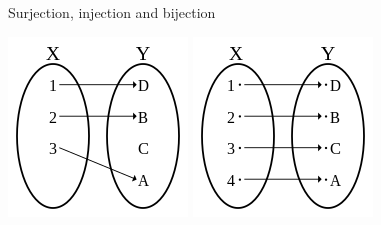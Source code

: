 \documentclass{beamer}
\begin{document}
\begin{frame}{Surjection, injection and bijection}
\begin{center}
\begin{minipage}{0.48\linewidth}
        \end{minipage}
        \hfill
        \begin{minipage}{0.49\linewidth}
            \centering
            \includegraphics[width=0.5\linewidth]{fig/Injection.svg.png}
            \includegraphics[width=0.5\linewidth]{fig/Bijection.svg.png}
        \end{minipage}
    \end{center}
\end{frame}
\end{document}
